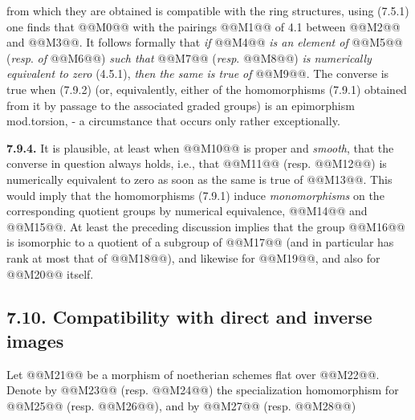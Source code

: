 
from which they are obtained is compatible with the ring structures, using (7.5.1) one finds that
@@M0@@
with the pairings @@M1@@ of 4.1 between @@M2@@ and @@M3@@. It follows formally that \emph{if} @@M4@@ \emph{is an element of} @@M5@@ (\emph{resp}. \emph{of} @@M6@@) \emph{such that} @@M7@@ (\emph{resp}. @@M8@@) \emph{is numerically equivalent to zero} (4.5.1), \emph{then the same is true of} @@M9@@. The converse is true when (7.9.2) (or, equivalently, either of the homomorphisms (7.9.1) obtained from it by passage to the associated graded groups) is an epimorphism mod.torsion, - a circumstance that occurs only rather exceptionally.

\textbf{7.9.4.} It is plausible, at least when @@M10@@ is proper and \emph{smooth}, that the converse in question always holds, i.e., that @@M11@@ (resp. @@M12@@) is numerically equivalent to zero as soon as the same is true of @@M13@@. This would imply that the homomorphisms (7.9.1) induce \emph{monomorphisms} on the corresponding quotient groups by numerical equivalence, @@M14@@ and @@M15@@. At least the preceding discussion implies that the group @@M16@@ is isomorphic to a quotient of a subgroup of @@M17@@ (and in particular has rank at most that of @@M18@@), and likewise for @@M19@@, and also for @@M20@@ itself.

\subsection*{7.10. Compatibility with direct and inverse images}
Let
@@M21@@
be a morphism of noetherian schemes flat over @@M22@@. Denote by @@M23@@ (resp. @@M24@@) the specialization homomorphism for @@M25@@ (resp. @@M26@@), and by @@M27@@ (resp. @@M28@@)
